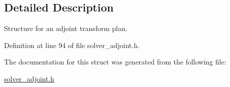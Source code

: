 \subsection{Detailed Description}
Structure for an adjoint transform plan. 

Definition at line 94 of file solver\_\-adjoint.h.

The documentation for this struct was generated from the following file:\begin{CompactItemize}
\item 
\hyperlink{solver__adjoint_8h}{solver\_\-adjoint.h}\end{CompactItemize}
